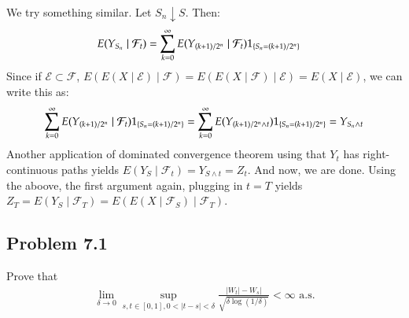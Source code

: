 \documentclass[12pt]{article}
\theoremstyle{definitionstyle}
\newcommand{\SET}[1]{\Set{\mskip-\medmuskip #1 \mskip-\medmuskip}}
\newcommand{\1}{\mathds 1}
\begin{document}
    We try something similar. Let $S_n \downarrow S$. Then:
    \begin{align*}
        E(Y_{S_n} \mid \mathcal F_t) &= \sum_{k=0}^\infty E(Y_{(k+1)/2^n} \mid \mathcal F_t) 1_{\SET{S_n = (k+1)/2^n}}
    \end{align*}
    Since if $\mathcal E \subset \mathcal F$, $E(E(X \mid \mathcal E) \mid \mathcal F) = E(E(X \mid \mathcal F) \mid \mathcal E) = E(X \mid \mathcal E)$, we can write this as:
    \begin{align*}
        \sum_{k=0}^\infty E(Y_{(k+1)/2^n} \mid \mathcal F_t) 1_{\SET{S_n = (k+1)/2^n}} &= \sum_{k=0}^\infty E(Y_{(k+1)/2^n \land t}) 1_{\SET{S_n = (k+1)/2^n}} = Y_{S_n \land t} \\
    \end{align*}
    Another application of dominated convergence theorem using that $Y_t$ has right-continuous paths yields $E(Y_S \mid \mathcal F_t) = Y_{S \land t} = Z_t$. And now, we are done. Using the aboove, the first argument again, plugging in $t = T$ yields $Z_{T} = E(Y_S \mid \mathcal F_T) = E(E(X \mid \mathcal F_S) \mid \mathcal F_T)$.

    \subsection*{Problem 7.1}
    Prove that 
    \begin{align*}
        \lim_{\delta \to 0} \sup_{s, t \in [0,1], 0<|t-s|<\delta} \frac{|W_t|-W_s|}{\sqrt{\delta \log(1/\delta)}} < \infty \text{ a.s.}
    \end{align*}
\end{document}

